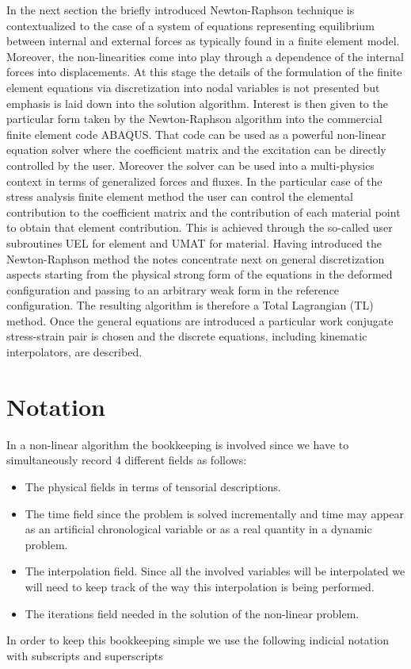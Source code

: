 In the next section the briefly introduced Newton-Raphson technique is contextualized to the case of a system of equations representing equilibrium between internal and external forces as typically found in a finite element model.  Moreover, the non-linearities come into play through a dependence of the internal forces into displacements.  At this stage the details of the formulation of the finite element equations via discretization into nodal variables is not presented but emphasis is laid down into the solution algorithm.  Interest is then given to the particular form taken by the Newton-Raphson algorithm into the commercial finite element code ABAQUS.  That code can be used as a powerful non-linear equation solver where the coefficient matrix and the excitation can be directly controlled by the user.  Moreover the solver can be used into a multi-physics context in terms of generalized forces and fluxes.  In the particular case of the stress analysis finite element method the user can control the elemental contribution to the coefficient matrix and the contribution of each material point to obtain that element contribution.  This is achieved through the so-called user subroutines UEL  for element and UMAT  for material.  Having introduced the Newton-Raphson method the notes concentrate next on general discretization aspects starting from the physical strong form of the equations in the deformed configuration and passing to an arbitrary weak form in the reference configuration.  The resulting algorithm is therefore a Total Lagrangian (TL) method.  Once the general equations are introduced a particular work conjugate stress-strain pair is chosen and the discrete equations, including kinematic interpolators, are described.

\section*{Notation}
In a non-linear algorithm the bookkeeping is involved since we have to simultaneously record 4 different fields as follows:
\begin{itemize}
	\item The physical fields in terms of tensorial descriptions.
	\item The time field since the problem is solved incrementally 	and time may appear as an artificial chronological variable 	or as a real quantity in a dynamic problem.
	\item The interpolation field.  Since all the involved variables will be interpolated we will need to keep track of the way this interpolation is being performed.
	\item The iterations field needed in the solution of the non-linear problem.
\end{itemize}
In order to keep this bookkeeping simple we use the following indicial notation with subscripts and superscripts

